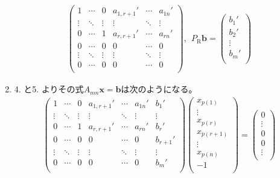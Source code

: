 \documentclass[dvipdfmx]{jsarticle}
\begin{document}
\begin{thm}
\begin{enumerate}
\begin{align*}
\begin{pmatrix}
1 & \cdots & 0 & a_{1,r + 1}' & \cdots & a_{1n}' \\
 \vdots & \ddots & \vdots & \vdots & \ddots & \vdots \\
0 & \cdots & 1 & a_{r,r + 1}' & \cdots & a_{rn}' \\
0 & \cdots & 0 & 0 & \cdots & 0 \\
 \vdots & \ddots & \vdots & \vdots & \ddots & \vdots \\
0 & \cdots & 0 & 0 & \cdots & 0 \\
\end{pmatrix},\ \ P_{\mathrm{R}}\mathbf{b} = \begin{pmatrix}
b_{1}' \\
b_{2}' \\
 \vdots \\
b_{m}' \\
\end{pmatrix}
\end{align*}
\item
  4. と5. よりその式$A_{mn}\mathbf{x} = \mathbf{b}$は次のようになる。
\begin{align*}
\begin{pmatrix}
1 & \cdots & 0 & a_{1,r + 1}' & \cdots & a_{1n}' & b_{1}' \\
 \vdots & \ddots & \vdots & \vdots & \ddots & \vdots & \vdots \\
0 & \cdots & 1 & a_{r,r + 1}' & \cdots & a_{rn}' & b_{r}' \\
0 & \cdots & 0 & 0 & \cdots & 0 & b_{r + 1}' \\
 \vdots & \ddots & \vdots & \vdots & \ddots & \vdots & \vdots \\
0 & \cdots & 0 & 0 & \cdots & 0 & b_{m}' \\
\end{pmatrix}\begin{pmatrix}
x_{p(1)} \\
 \vdots \\
x_{p(r)} \\
x_{p(r + 1)} \\
 \vdots \\
x_{p(n)} \\
 - 1 \\
\end{pmatrix} = \begin{pmatrix}
0 \\
 \vdots \\
0 \\
0 \\
 \vdots \\

\end{pmatrix}
\end{align*}
\end{enumerate}
\end{thm}
\end{document}
